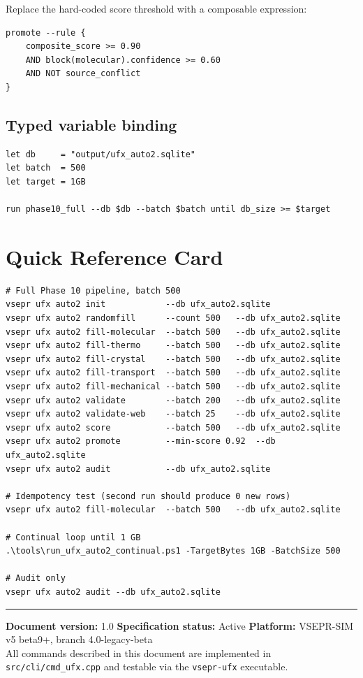 \documentclass[11pt,letterpaper]{article}
\begin{document}
Replace the hard-coded score threshold with a composable expression:

\begin{lstlisting}
promote --rule {
	composite_score >= 0.90
	AND block(molecular).confidence >= 0.60
	AND NOT source_conflict
}
\end{lstlisting}

\subsection{Typed variable binding}

\begin{lstlisting}
let db     = "output/ufx_auto2.sqlite"
let batch  = 500
let target = 1GB

run phase10_full --db $db --batch $batch until db_size >= $target
\end{lstlisting}

\section{Quick Reference Card}

\begin{lstlisting}
# Full Phase 10 pipeline, batch 500
vsepr ufx auto2 init            --db ufx_auto2.sqlite
vsepr ufx auto2 randomfill      --count 500   --db ufx_auto2.sqlite
vsepr ufx auto2 fill-molecular  --batch 500   --db ufx_auto2.sqlite
vsepr ufx auto2 fill-thermo     --batch 500   --db ufx_auto2.sqlite
vsepr ufx auto2 fill-crystal    --batch 500   --db ufx_auto2.sqlite
vsepr ufx auto2 fill-transport  --batch 500   --db ufx_auto2.sqlite
vsepr ufx auto2 fill-mechanical --batch 500   --db ufx_auto2.sqlite
vsepr ufx auto2 validate        --batch 200   --db ufx_auto2.sqlite
vsepr ufx auto2 validate-web    --batch 25    --db ufx_auto2.sqlite
vsepr ufx auto2 score           --batch 500   --db ufx_auto2.sqlite
vsepr ufx auto2 promote         --min-score 0.92  --db ufx_auto2.sqlite
vsepr ufx auto2 audit           --db ufx_auto2.sqlite

# Idempotency test (second run should produce 0 new rows)
vsepr ufx auto2 fill-molecular  --batch 500   --db ufx_auto2.sqlite

# Continual loop until 1 GB
.\tools\run_ufx_auto2_continual.ps1 -TargetBytes 1GB -BatchSize 500

# Audit only
vsepr ufx auto2 audit --db ufx_auto2.sqlite
\end{lstlisting}

\vspace{1cm}
\hrule
\vspace{0.4cm}
{\small
\textbf{Document version:} 1.0 \quad
\textbf{Specification status:} Active \quad
\textbf{Platform:} VSEPR-SIM v5 beta9+, branch 4.0-legacy-beta \\
All commands described in this document are implemented in
\texttt{src/cli/cmd\_ufx.cpp} and testable via the \texttt{vsepr-ufx}
executable.
}
\end{document}
